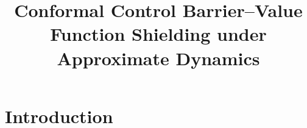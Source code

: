 \documentclass[letterpaper,10pt,conference]{ieeeconf}
\title{Conformal Control Barrier--Value Function Shielding under Approximate Dynamics}
\author{}
\newcommand{\fail}{\mathcal{K}}
\begin{document}
\maketitle

\begin{abstract}
\end{abstract}

\section{Introduction}




\end{document}
